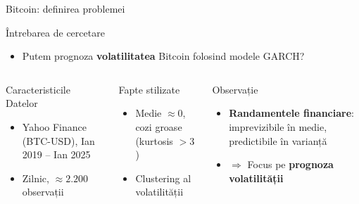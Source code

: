 \documentclass[9pt, aspectratio=169, t]{beamer}
\begin{document}
\begin{frame}{Bitcoin: definirea problemei}
    \vspace{-2mm}
    \begin{block}{Întrebarea de cercetare}
        \begin{itemize}\setlength{\itemsep}{0pt}
            \item Putem prognoza \textbf{volatilitatea} Bitcoin folosind modele GARCH?
        \end{itemize}
    \end{block}
    \vspace{-1mm}
    \begin{columns}[T]
        {\small
        \begin{block}{Caracteristicile Datelor}
            \begin{itemize}\setlength{\itemsep}{0pt}
                \item Yahoo Finance (BTC-USD), Ian 2019 -- Ian 2025
                \item Zilnic, $\approx 2.200$ observații
            \end{itemize}
        \end{block}

        \begin{block}{Fapte stilizate}
            \begin{itemize}\setlength{\itemsep}{0pt}
                \item Medie $\approx 0$, cozi groase (kurtosis $> 3$)
                \item Clustering al volatilității
            \end{itemize}
        \end{block}
        }

        {\small
        \begin{alertblock}{Observație}
            \begin{itemize}\setlength{\itemsep}{0pt}
                \item \textbf{Randamentele financiare}: imprevizibile în medie, predictibile în varianță
                \item $\Rightarrow$ Focus pe \textbf{prognoza volatilității}
            \end{itemize}
        \end{alertblock}
        }
    \end{columns}
\end{frame}
\end{document}
